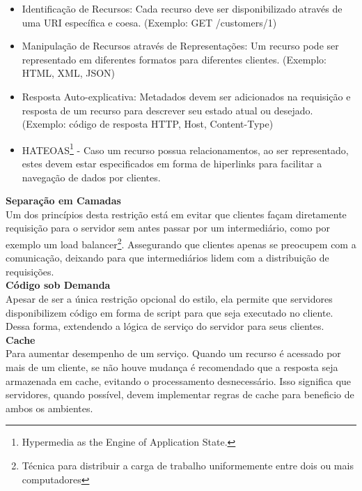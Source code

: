 \begin{itemize}[noitemsep]
\item Identificação de Recursos: Cada recurso deve ser disponibilizado através de uma URI específica e coesa. (Exemplo: GET /customers/1)
\item Manipulação de Recursos através de Representações: Um recurso pode ser representado em diferentes formatos para diferentes clientes. (Exemplo: HTML, XML, JSON)
\item Resposta Auto-explicativa: Metadados devem ser adicionados na requisição e resposta de um recurso para descrever seu estado atual ou desejado. (Exemplo: código de resposta HTTP, Host, Content-Type)
\item HATEOAS\footnote{
  Hypermedia as the Engine of Application State.
} - Caso um recurso possua relacionamentos, ao ser representado, estes devem estar especificados em forma de hiperlinks para facilitar a navegação de dados por clientes.
\end{itemize}

\textbf{Separação em Camadas} \\

Um dos princípios desta restrição está em evitar que clientes façam diretamente requisição para o servidor sem antes passar por um intermediário, como por exemplo um load balancer\footnote{
  Técnica para distribuir a carga de trabalho uniformemente entre dois ou mais computadores
}. Assegurando que clientes apenas se preocupem com a comunicação, deixando para que intermediários lidem com a distribuição de requisições. \cite{Fielding2000} \\

\textbf{Código sob Demanda} \\

Apesar de ser a única restrição opcional do estilo, ela permite que servidores disponibilizem código em forma de script para que seja executado no cliente. Dessa forma, extendendo a lógica de serviço do servidor para seus clientes. \cite{Fielding2000} \\

\textbf{Cache} \\

Para aumentar desempenho de um serviço. Quando um recurso é acessado por mais de um cliente, se não houve mudança é recomendado que a resposta seja armazenada em cache, evitando o processamento desnecessário. Isso significa que servidores, quando possível, devem implementar regras de cache para beneficio de ambos os ambientes. \cite{Fielding2000}

